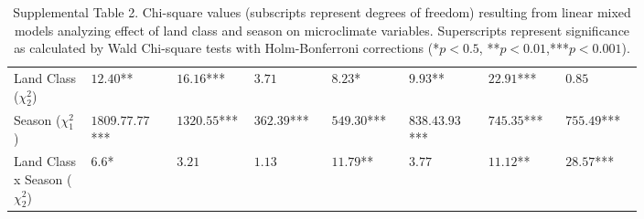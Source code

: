 \documentclass[12pt]{article}
\begin{document}
\begin{landscape}
\begin{table}
\begin{tabular}{P{0.10\linewidth}P{0.10\linewidth}P{0.10\linewidth}P{0.10\linewidth}P{0.10\linewidth}P{0.10\linewidth}P{0.10\linewidth}P{0.10\linewidth}}
Land Class ($\chi^2_2$) 		& $12.40$**  		& $16.16$***  	& $3.71$		& $8.23$*		& $9.93$**		& $22.91$***	& $0.85$\\
Season 	($\chi^2_1$)			& $1809.77.77$*** 	& $1320.55$*** 	& $362.39$*** 	& $549.30$*** 	& $838.43.93$***& $745.35$***	& $755.49$***\\
Land Class x Season ($\chi^2_2$)& $6.6$* 			& $3.21$  		& $1.13$		& $11.79$**		& $3.77$		& $11.12$**		& $28.57$***\\
\hline
\end{tabular}
\caption{Supplemental Table 2. Chi-square values (subscripts represent degrees of freedom) resulting from linear mixed models analyzing effect of land class and season on microclimate variables. Superscripts represent significance as calculated by Wald Chi-square tests with Holm-Bonferroni corrections (*$p<0.5$, **$p<0.01$,***$p<0.001$).}
\end{table}
\end{landscape}
\end{document}
